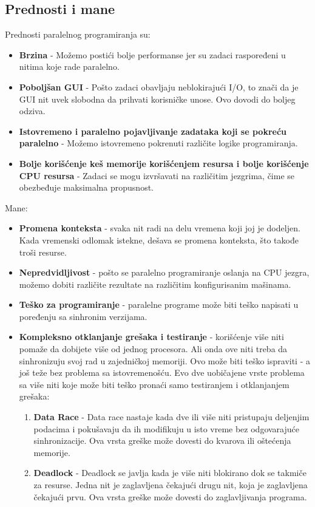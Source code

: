 \documentclass[a4paper]{article}
\begin{document}
\subsection{Prednosti i mane}

Prednosti paralelnog programiranja su:
\begin{itemize}
\item \textbf{Brzina} - Možemo postići bolje performanse jer su zadaci raspoređeni u nitima koje rade paralelno.\cite{zoboko}
\item \textbf{Poboljšan GUI} - Pošto zadaci obavljaju neblokirajući I/O, to znači da je GUI nit uvek slobodna da prihvati korisničke unose. Ovo dovodi do boljeg odziva.\cite{zoboko}
\item \textbf{Istovremeno i paralelno pojavljivanje zadataka koji se pokreću paralelno} - Možemo istovremeno pokrenuti različite logike programiranja.\cite{zoboko}
\item \textbf{Bolje korišćenje keš memorije korišćenjem resursa i bolje korišćenje CPU resursa} - Zadaci se mogu izvršavati na različitim jezgrima, čime se obezbeđuje maksimalna propusnost.\cite{zoboko}\\
\end{itemize}
Mane:
\begin{itemize}
\item \textbf{Promena konteksta} - svaka nit radi na delu vremena koji joj je dodeljen. Kada vremenski odlomak istekne, dešava se promena konteksta, što takođe troši resurse.\cite{zoboko}
\item \textbf{Nepredvidljivost} - pošto se paralelno programiranje oslanja na CPU jezgra, možemo dobiti različite rezultate na različitim konfigurisanim mašinama.\cite{zoboko}
\item \textbf{Teško za programiranje} - paralelne programe može biti teško napisati u poređenju sa sinhronim verzijama.\cite{zoboko}
\item \textbf{Kompleksno otklanjanje grešaka i testiranje} - korišćenje više niti pomaže da dobijete više od jednog procesora. Ali onda ove niti treba da sinhronizuju svoj rad u zajedničkoj memoriji. Ovo može biti teško ispraviti - a još teže bez problema sa istovremenošću\cite{zoboko}.
Evo dve uobičajene vrste problema sa više niti koje može biti teško pronaći samo testiranjem i otklanjanjem grešaka:
\begin{enumerate}
\item \textbf{Data Race} - 
Data race nastaje kada dve ili više niti pristupaju deljenjim podacima i pokušavaju da ih modifikuju u isto vreme bez odgovarajuće sinhronizacije. Ova vrsta greške može dovesti do kvarova ili oštećenja memorije.\cite{perforce}
\item \textbf{Deadlock} - 
Deadlock se javlja kada je više niti blokirano dok se takmiče za resurse. Jedna nit je zaglavljena čekajući drugu nit, koja je zaglavljena čekajući prvu. Ova vrsta greške može dovesti do zaglavljivanja programa.\cite{perforce}
\end{enumerate}
\end{itemize}
\end{document}
